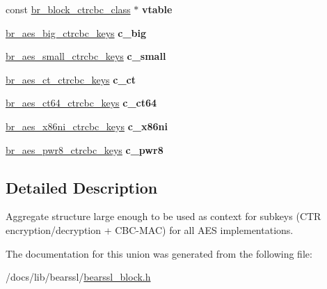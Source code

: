 \begin{DoxyCompactItemize}
\item 
\mbox{\label{unionbr__aes__gen__ctrcbc__keys_af74f3ebd3ce4f840b056f356cb4e2dcc}} 
const \hyperlink{bearssl__block_8h_acc35dad952fda67b68df0b107fe26f0b}{br\+\_\+block\+\_\+ctrcbc\+\_\+class} $\ast$ {\bfseries vtable}
\item 
\mbox{\label{unionbr__aes__gen__ctrcbc__keys_ab2594bbddf141d1ac267f7b6bdb61d34}} 
\hyperlink{structbr__aes__big__ctrcbc__keys}{br\+\_\+aes\+\_\+big\+\_\+ctrcbc\+\_\+keys} {\bfseries c\+\_\+big}
\item 
\mbox{\label{unionbr__aes__gen__ctrcbc__keys_ac431758ff19956e52b9ed44eae1efd8b}} 
\hyperlink{structbr__aes__small__ctrcbc__keys}{br\+\_\+aes\+\_\+small\+\_\+ctrcbc\+\_\+keys} {\bfseries c\+\_\+small}
\item 
\mbox{\label{unionbr__aes__gen__ctrcbc__keys_aa7d94d88609bedb1084fe18777307c18}} 
\hyperlink{structbr__aes__ct__ctrcbc__keys}{br\+\_\+aes\+\_\+ct\+\_\+ctrcbc\+\_\+keys} {\bfseries c\+\_\+ct}
\item 
\mbox{\label{unionbr__aes__gen__ctrcbc__keys_af412cecd5c00b40ba523b40d7fbbf652}} 
\hyperlink{structbr__aes__ct64__ctrcbc__keys}{br\+\_\+aes\+\_\+ct64\+\_\+ctrcbc\+\_\+keys} {\bfseries c\+\_\+ct64}
\item 
\mbox{\label{unionbr__aes__gen__ctrcbc__keys_a73a34d31d5f3dc6d4662d98731c38959}} 
\hyperlink{structbr__aes__x86ni__ctrcbc__keys}{br\+\_\+aes\+\_\+x86ni\+\_\+ctrcbc\+\_\+keys} {\bfseries c\+\_\+x86ni}
\item 
\mbox{\label{unionbr__aes__gen__ctrcbc__keys_ad712c093a226ffab2163bfcb6ec1fef4}} 
\hyperlink{structbr__aes__pwr8__ctrcbc__keys}{br\+\_\+aes\+\_\+pwr8\+\_\+ctrcbc\+\_\+keys} {\bfseries c\+\_\+pwr8}
\end{DoxyCompactItemize}


\subsection{Detailed Description}
Aggregate structure large enough to be used as context for subkeys (C\+TR encryption/decryption + C\+B\+C-\/\+M\+AC) for all A\+ES implementations. 

The documentation for this union was generated from the following file\+:\begin{DoxyCompactItemize}
\item 
/docs/lib/bearssl/\hyperlink{bearssl__block_8h}{bearssl\+\_\+block.\+h}\end{DoxyCompactItemize}

